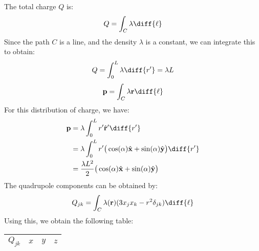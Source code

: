 \documentclass[crop=false,class=book,oneside]{standalone}
\begin{document}
            \begin{solution}
                The total charge $Q$ is:
                \begin{equation}
                    Q=\int_{C}\lambda\diff{\ell}
                \end{equation}
                Since the path $C$ is a line, and the density $\lambda$
                is a constant, we can integrate this to obtain:
                \begin{equation}
                    Q=\int_{0}^{L}\lambda\diff{r'}=\lambda{L}
                \end{equation}
                \begin{equation}
                    \mathbf{p}=\int_{C}\lambda\mathbf{r}\diff{\ell}
                \end{equation}
                For this distribution of charge, we have:
                \begin{subequations}
                    \begin{align}
                        \mathbf{p}&=
                            \lambda\int_{0}^{L}r'\hat{\mathbf{r}}'
                                \diff{r'}\\
                        &=\lambda\int_{0}^{L}r'
                            \big(\cos(\alpha)\hat{\mathbf{x}}+
                                 \sin(\alpha)\hat{\mathbf{y}}\big)
                                    \diff{r'}\\
                        &=\frac{\lambda{L}^{2}}{2}
                            \big(\cos(\alpha)\hat{\mathbf{x}}+
                                 \sin(\alpha)\hat{\mathbf{y}}\big)
                    \end{align}
                \end{subequations}
                The quadrupole components can be obtained by:
                \begin{equation}
                    Q_{jk}=\int_{C}\lambda(\mathbf{r})
                        (3x_{j}x_{k}-r^{2}\delta_{jk})\diff{\ell}
                \end{equation}
                Using this, we obtain the following table:
                \begin{table}[H]
                    \centering
                    \captionsetup{type=table}
                    \begin{tabular}{|c|c|c|c|}
                        \hline
                        $Q_{jk}$&$x$&$y$&$z$\\
                        \hline

\end{tabular}
\end{table}
\end{solution}
\end{document}
